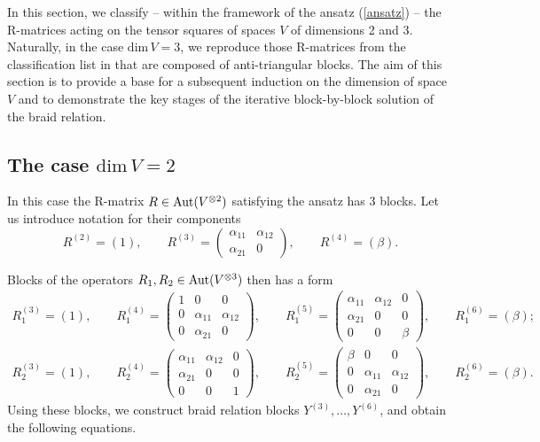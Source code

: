 \documentclass[11pt]{article}
\def\nn{\nonumber}\def\lb{\label}\def\nin{\noindent}
\def\ba{\begin{eqnarray}}\def\ea{\end{eqnarray}}
\begin{document}
In this section, we classify -- within the framework of the ansatz (\ref{ansatz}) -- the R-matrices acting on the tensor squares of spaces $V$ of dimensions 2 and 3. Naturally, in the case $\mbox{dim}\, V=3$, we reproduce those R-matrices from the classification list in  \cite{HMR} that  are composed of anti-triangular blocks. The aim of this section is to provide a base for a subsequent induction on the dimension of space $V$ and to demonstrate the key stages of the iterative block-by-block solution of the braid relation.

\subsection{The case $\mbox{dim}\, V = 2$}
In this case the R-matrix $R\in {\rm Aut}(V^{\otimes 2})$ satisfying the ansatz has 3 blocks.
Let us introduce notation for their components
$$
R^{(2)} =(1), \qquad R^{(3)} =\left(
\begin{array}{cc}
	\alpha_{11} &	\alpha_{12}
	\\
 \alpha_{21} & 	 0
\end{array}\right), \qquad
R^{(4)} =(\beta).
$$

Blocks of the operators $R_1, R_2\in {\rm Aut}(V^{\otimes 3})$ then has a form
\ba
\nn
R_1^{(3)} =(1), \qquad R_1^{(4)} =\left(
\begin{array}{ccc}
 1 & 0 & 0
	\\
 0&	 \alpha_{11} &  \alpha_{12}
	\\
 0&	 \alpha_{21} &  0
\end{array}\right), \qquad
R_1^{(5)} =\left(
\begin{array}{ccc}
	\alpha_{11} & \alpha_{12}& 0
	\\
	\alpha_{21} & 0 & 0
	\\
	0 & 0& \beta
\end{array}\right), \qquad
R_1^{(6)} =(\beta);
\\[10pt]
\nn
R_2^{(3)} =(1), \qquad R_2^{(4)} =\left(
\begin{array}{ccc}
	\alpha_{11} & \alpha_{12}& 0
	\\
	\alpha_{21} & 0 & 0
	\\
	0 & 0& 1
\end{array}\right), \qquad
R_2^{(5)} =\left(
\begin{array}{ccc}
\beta & 0 & 0
\\
0&	\alpha_{11} & \alpha_{12}
\\
0&	\alpha_{21} & 0
\end{array}\right), \qquad
R_2^{(6)} =(\beta).
\ea
Using these blocks, we construct braid relation blocks $Y^{(3)},\dots ,Y^{(6)}$, and obtain the following equations.
\end{document}
